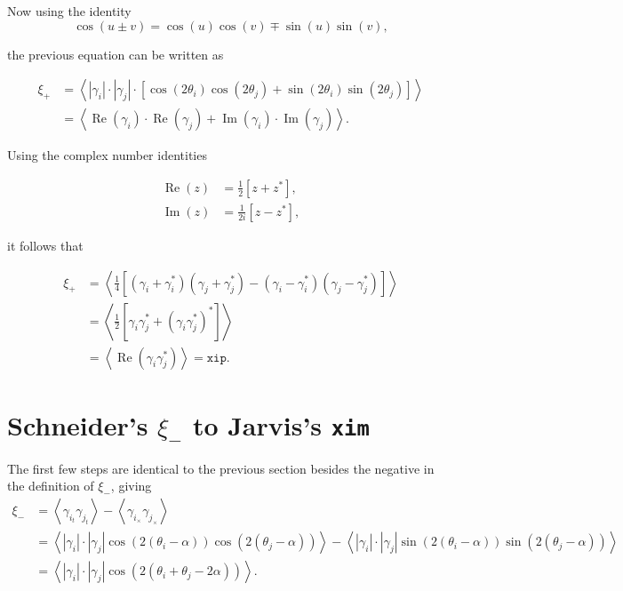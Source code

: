 \documentclass[%
 reprint,
 amsmath,amssymb,
 aps,nofootinbib
]{revtex4-1}
\begin{document}
Now using the identity
\begin{equation}\label{trig2}
\cos(u\pm v)=\cos\left(u\right)\cos\left(v\right)\mp\sin\left(u\right)\sin\left(v\right),
\end{equation}

the previous equation can be written as

\begin{align*}
\xi_+&=\left<|\gamma_i|\cdot|\gamma_j|\cdot\left[\cos\left(2\theta_i\right)\cos\left(2\theta_j\right)+\sin\left(2\theta_i\right)\sin\left(2\theta_j\right)\right]\right>\\
&=\left<\operatorname{Re}(\gamma_i)\cdot\operatorname{Re}(\gamma_j)+\operatorname{Im}(\gamma_i)\cdot\operatorname{Im}(\gamma_j)\right>.
\end{align*}

Using the complex number identities

\begin{align}
\operatorname{Re}(z)&=\frac{1}{2}\left[z+z^*\right],\label{complex1}\\
\operatorname{Im}(z)&=\frac{1}{2i}\left[z-z^*\right]\label{complex2},
\end{align}

it follows that

\begin{align*}
\xi_+&=\left<\frac{1}{4}\left[(\gamma_i+\gamma_i^*)(\gamma_j+\gamma_j^*)-(\gamma_i-\gamma_i^*)(\gamma_j-\gamma_j^*)\right]\right>\\
&=\left<\frac{1}{2}\left[\gamma_i\gamma_j^*+(\gamma_i\gamma_j^*)^*\right]\right>\\
&=\left<\operatorname{Re}(\gamma_i\gamma_j^*)\right>=\texttt{xip}.
\end{align*}

\section*{Schneider's $\xi_-$ to Jarvis's \texttt{xim}}

The first few steps are identical to the previous section besides the negative in the definition of $\xi_-$, giving
\begin{align*}
\xi_-&=\left<\gamma_{i_t}\gamma_{j_t}\right>-\left<\gamma_{i_\times}\gamma_{j_\times}\right>\\
&=\left<|\gamma_i|\cdot|\gamma_j|\cos\left(2(\theta_i-\alpha)\right)\cos\left(2(\theta_j-\alpha)\right)\right>-\left<|\gamma_i|\cdot|\gamma_j|\sin\left(2(\theta_i-\alpha)\right)\sin\left(2(\theta_j-\alpha)\right)\right>\\
&=\left<|\gamma_i|\cdot|\gamma_j|\cos\left(2(\theta_i+\theta_j-2\alpha)\right)\right>.
\end{align*}
\end{document}
